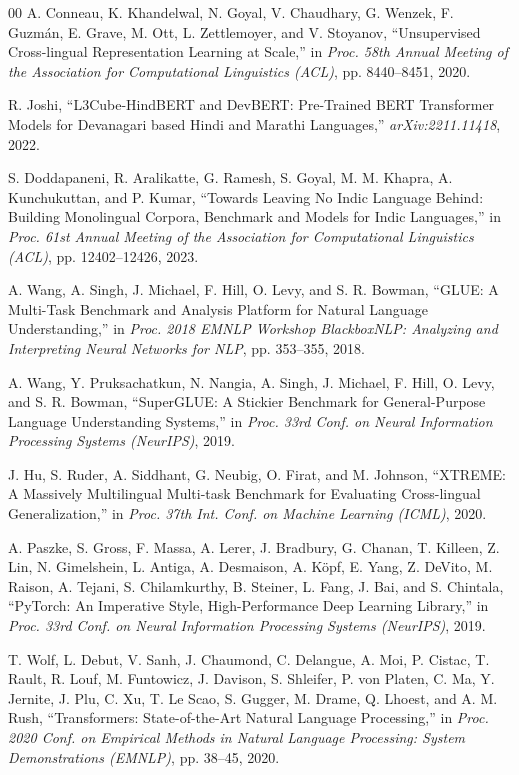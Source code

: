 \documentclass[conference]{IEEEtran}
\begin{document}
\begin{thebibliography}{00}
 A. Conneau, K. Khandelwal, N. Goyal, V. Chaudhary, G. Wenzek, F. Guzm\'an, E. Grave, M. Ott, L. Zettlemoyer, and V. Stoyanov, ``Unsupervised Cross-lingual Representation Learning at Scale,'' in \textit{Proc. 58th Annual Meeting of the Association for Computational Linguistics (ACL)}, pp. 8440--8451, 2020.

 R. Joshi, ``L3Cube-HindBERT and DevBERT: Pre-Trained BERT Transformer Models for Devanagari based Hindi and Marathi Languages,'' \textit{arXiv:2211.11418}, 2022.

 S. Doddapaneni, R. Aralikatte, G. Ramesh, S. Goyal, M. M. Khapra, A. Kunchukuttan, and P. Kumar, ``Towards Leaving No Indic Language Behind: Building Monolingual Corpora, Benchmark and Models for Indic Languages,'' in \textit{Proc. 61st Annual Meeting of the Association for Computational Linguistics (ACL)}, pp. 12402--12426, 2023.

 A. Wang, A. Singh, J. Michael, F. Hill, O. Levy, and S. R. Bowman, ``GLUE: A Multi-Task Benchmark and Analysis Platform for Natural Language Understanding,'' in \textit{Proc. 2018 EMNLP Workshop BlackboxNLP: Analyzing and Interpreting Neural Networks for NLP}, pp. 353--355, 2018.

 A. Wang, Y. Pruksachatkun, N. Nangia, A. Singh, J. Michael, F. Hill, O. Levy, and S. R. Bowman, ``SuperGLUE: A Stickier Benchmark for General-Purpose Language Understanding Systems,'' in \textit{Proc. 33rd Conf. on Neural Information Processing Systems (NeurIPS)}, 2019.

 J. Hu, S. Ruder, A. Siddhant, G. Neubig, O. Firat, and M. Johnson, ``XTREME: A Massively Multilingual Multi-task Benchmark for Evaluating Cross-lingual Generalization,'' in \textit{Proc. 37th Int. Conf. on Machine Learning (ICML)}, 2020.

 A. Paszke, S. Gross, F. Massa, A. Lerer, J. Bradbury, G. Chanan, T. Killeen, Z. Lin, N. Gimelshein, L. Antiga, A. Desmaison, A. K\"opf, E. Yang, Z. DeVito, M. Raison, A. Tejani, S. Chilamkurthy, B. Steiner, L. Fang, J. Bai, and S. Chintala, ``PyTorch: An Imperative Style, High-Performance Deep Learning Library,'' in \textit{Proc. 33rd Conf. on Neural Information Processing Systems (NeurIPS)}, 2019.

 T. Wolf, L. Debut, V. Sanh, J. Chaumond, C. Delangue, A. Moi, P. Cistac, T. Rault, R. Louf, M. Funtowicz, J. Davison, S. Shleifer, P. von Platen, C. Ma, Y. Jernite, J. Plu, C. Xu, T. Le Scao, S. Gugger, M. Drame, Q. Lhoest, and A. M. Rush, ``Transformers: State-of-the-Art Natural Language Processing,'' in \textit{Proc. 2020 Conf. on Empirical Methods in Natural Language Processing: System Demonstrations (EMNLP)}, pp. 38--45, 2020.


\end{thebibliography}
\end{document}
